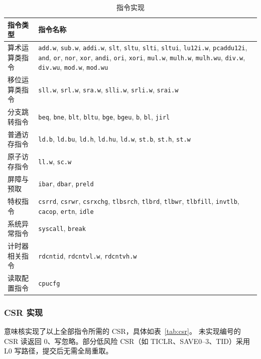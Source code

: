 \begin{table}[H]
\centering
\caption{指令实现}
\label{tab:inst}
\small
\begin{tabular}{>{\raggedright\arraybackslash}p{3.2cm}>{\raggedright\arraybackslash}p{11.5cm}}
\toprule
指令类型 & 指令名称 \\
\midrule
算术运算类指令 &
\texttt{add.w}, \texttt{sub.w}, \texttt{addi.w}, \texttt{slt}, \texttt{sltu}, \texttt{slti}, \texttt{sltui},
\texttt{lu12i.w}, \texttt{pcaddu12i}, \texttt{and}, \texttt{or}, \texttt{nor}, \texttt{xor},
\texttt{andi}, \texttt{ori}, \texttt{xori}, \texttt{mul.w}, \texttt{mulh.w}, \texttt{mulh.wu},
\texttt{div.w}, \texttt{div.wu}, \texttt{mod.w}, \texttt{mod.wu} \\
移位运算类指令 &
\texttt{sll.w}, \texttt{srl.w}, \texttt{sra.w}, \texttt{slli.w}, \texttt{srli.w}, \texttt{srai.w} \\
分支跳转指令 &
\texttt{beq}, \texttt{bne}, \texttt{blt}, \texttt{bltu}, \texttt{bge}, \texttt{bgeu}, \texttt{b}, \texttt{bl}, \texttt{jirl} \\
普通访存指令 &
\texttt{ld.b}, \texttt{ld.bu}, \texttt{ld.h}, \texttt{ld.hu}, \texttt{ld.w}, \texttt{st.b}, \texttt{st.h}, \texttt{st.w} \\
原子访存指令 & \texttt{ll.w}, \texttt{sc.w} \\
屏障与预取 & \texttt{ibar}, \texttt{dbar}, \texttt{preld} \\
特权指令 &
\texttt{csrrd}, \texttt{csrwr}, \texttt{csrxchg}, \texttt{tlbsrch}, \texttt{tlbrd}, \texttt{tlbwr},
\texttt{tlbfill}, \texttt{invtlb}, \texttt{cacop}, \texttt{ertn}, \texttt{idle} \\
系统异常指令 & \texttt{syscall}, \texttt{break} \\
计时器相关指令 & \texttt{rdcntid}, \texttt{rdcntvl.w}, \texttt{rdcntvh.w} \\
读取配置指令 & \texttt{cpucfg} \\
\bottomrule
\end{tabular}
\end{table}

\subsubsection{CSR 实现}

意味核实现了以上全部指令所需的 CSR，具体如表~\ref{tab:csr}。
未实现编号的 CSR 读返回 0、写忽略。部分低风险 CSR（如 TICLR、SAVE0--3、TID）采用 L0 写路径，提交后无需全局重取。

